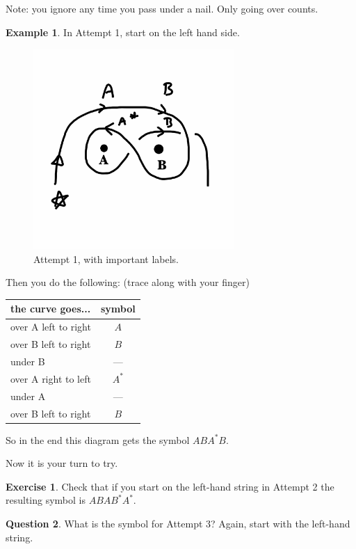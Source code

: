 \documentclass[12pt,letterpaper]{article}
\theoremstyle{definition}
\newtheorem{question}{Question}
\newtheorem{example}{Example}
\newtheorem{exercise}[question]{Exercise}
\begin{document}
Note: you ignore any time you pass under a nail. Only going over counts.

\begin{example}
In Attempt 1, start on the left hand side.
\begin{figure}[h]
    \centering
    \includegraphics[height=3in]{rgp01pics/coded.png}
    \caption{Attempt 1, with important labels.}
\end{figure}
Then you do the following: (trace along with your finger)\\
\begin{center}
\begin{tabular}{lc}
the curve goes... & symbol \\
\hline
over A left to right & $A$\\
over B left to right & $B$\\
under B & --- \\
over A right to left & $A^*$\\
under A & --- \\
over B left to right & $B$ 
\end{tabular}
\end{center}
So in the end this diagram gets the symbol $ABA^*B$.
\end{example}

Now it is your turn to try.
\begin{exercise}
Check that if you start on the left-hand string in Attempt 2 the resulting symbol is $ABAB^*A^*$.
\end{exercise}

\begin{question}
What is the symbol for Attempt 3? Again, start with the left-hand string.
\end{question}
\end{document}
